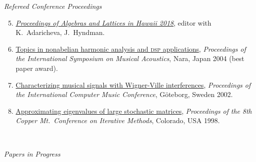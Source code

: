     {\it Refereed Conference Proceedings}\\[-6pt]
    \begin{enumerate}
      \setcounter{enumi}{4}

     \item \href{http://www.lulu.com/shop/kira-adaricheva-and-william-demeo-and-jennifer-hyndman/algebras-and-lattices-in-hawaii-honoring-ralph-freese-bill-lampe-and-jb-nation/paperback/product-23634583.html}{\it Proceedings of Algebras and Lattices in Hawaii 2018}, editor with K.~Adaricheva, J.~Hyndman.

    \item \href{https://github.com/williamdemeo/ISMA2004/raw/master/DeMeo-ISMA2004-FinalPaper.pdf}%
           {Topics in nonabelian harmonic analysis and \textsc{dsp}  applications},
      {\it Proceedings of the International Symposium on Musical Acoustics}, Nara, Japan 2004
      (best paper award).

    \item \href{https://github.com/williamdemeo/ICMC2002/raw/master/DeMeo-ICMC2002.pdf}%
           {Characterizing musical signals with Wigner-Ville interferences},
      {\it Proceedings of the International Computer Music Conference}, G\"{o}teborg, Sweden 2002.

     \item \href{https://williamdemeo.github.io/MSThesis}%
           {Approximating eigenvalues of large stochastic matrices},
      {\it Proceedings of the 8th Copper Mt.~Conference on Iterative Methods},
      Colorado, USA 1998.
    \end{enumerate}

\newpage

~\vspace{-14mm}


    {\it Papers in Progress}\\[-8pt]

